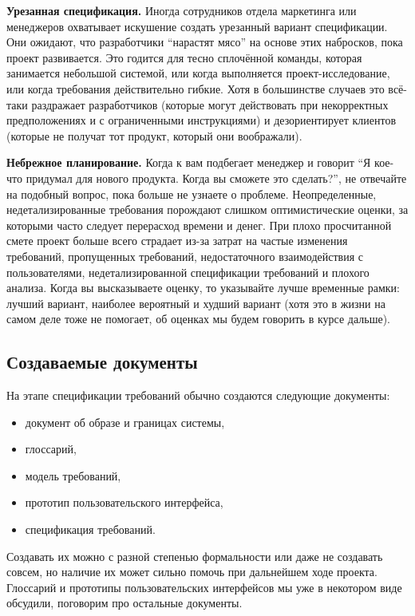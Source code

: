 \documentclass{../../text-style}
\begin{document}
\textbf{Урезанная спецификация.}
Иногда сотрудников отдела маркетинга или менеджеров охватывает искушение создать урезанный вариант спецификации.
Они ожидают, что разработчики \enquote{нарастят мясо} на основе этих набросков, пока проект развивается.
Это годится для тесно сплочённой команды, которая занимается небольшой системой, или когда выполняется проект-исследование, или когда требования действительно гибкие.
Хотя в большинстве случаев это всё-таки раздражает разработчиков (которые могут действовать при некорректных предположениях и с ограниченными инструкциями) и дезориентирует клиентов (которые не получат тот продукт, который они воображали).

\textbf{Небрежное планирование.} Когда к вам подбегает менеджер и говорит \enquote{Я кое-что придумал для нового продукта. Когда вы сможете это сделать?}, не отвечайте на подобный вопрос, пока больше не узнаете о проблеме.
Неопределенные, недетализированные требования порождают слишком оптимистические оценки, за которыми часто следует перерасход времени и денег.
При плохо просчитанной смете проект больше всего страдает из-за затрат на частые изменения требований, пропущенных требований, недостаточного взаимодействия с пользователями, недетализированной спецификации требований и плохого анализа.
Когда вы высказываете оценку, то указывайте лучше временные рамки: лучший вариант, наиболее вероятный и худший вариант (хотя это в жизни на самом деле тоже не помогает, об оценках мы будем говорить в курсе дальше).

\subsection{Создаваемые документы}

На этапе спецификации требований обычно создаются следующие документы:

\begin{itemize}
    \item документ об образе и границах системы,
    \item глоссарий,
    \item модель требований,
    \item прототип пользовательского интерфейса,
    \item спецификация требований.
\end{itemize}

Создавать их можно с разной степенью формальности или даже не создавать совсем, но наличие их может сильно помочь при дальнейшем ходе проекта.
Глоссарий и прототипы пользовательских интерфейсов мы уже в некотором виде обсудили, поговорим про остальные документы.
\end{document}
